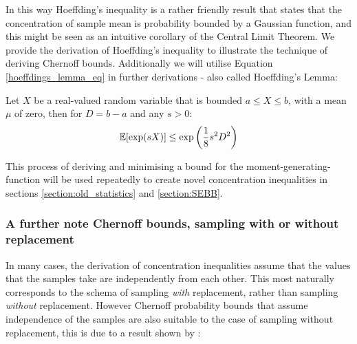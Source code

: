 
In this way Hoeffding's inequality is a rather friendly result that states that the concentration of sample mean is probability bounded by a Gaussian function, and this might be seen as an intuitive corollary of the Central Limit Theorem. 
We provide the derivation of Hoeffding's inequality to illustrate the technique of deriving Chernoff bounds.
Additionally we will utilise Equation \ref{hoeffdings_lemma_eq} in further derivations - also called Hoeffding's Lemma:

\begin{lemma}\label{Hoeffdings_lemma_lemma}
Let $X$ be a real-valued random variable that is bounded $a\le X\le b$, with a mean $\mu$ of zero, then for $D=b-a$ and any $s>0$:
$$\operatorname{\mathbb{E}}[\exp(sX)] \le \exp\left(\frac{1}{8}s^2D^2 \right)$$
\end{lemma}

This process of deriving and minimising a bound for the moment-generating-function will be used repeatedly to create novel concentration inequalities in sections \ref{section:old_statistics} and \ref{section:SEBB}.



\subsubsection{A further note Chernoff bounds, sampling with or without replacement}

In many cases, the derivation of concentration inequalities assume that the values that the samples take are independently from each other. 
This most naturally corresponds to the schema of sampling \textit{with} replacement, rather than sampling \textit{without} replacement.
However Chernoff probability bounds that assume independence of the samples are also suitable to the case of sampling without replacement, this is due to a result shown by \cite{hoeffding1}:


